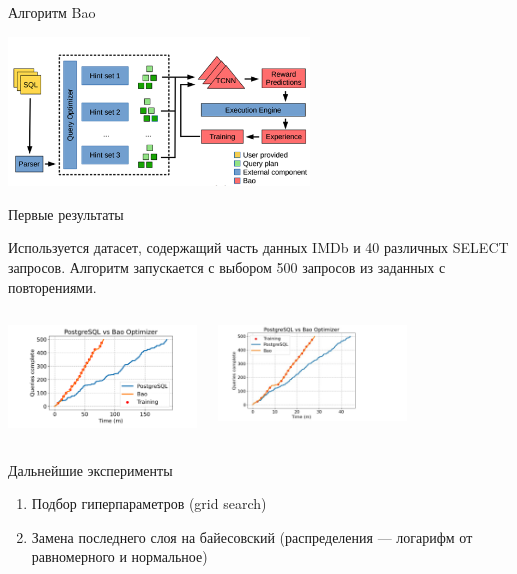 \documentclass{beamer}
\begin{document}
\begin{frame}{Алгоритм Bao}
\begin{center}
\includegraphics[width=8cm]{bao.png}
\end{center}
\end{frame}
\begin{frame}{Первые результаты}

Используется датасет, содержащий часть данных IMDb и 40 различных SELECT запросов.
Алгоритм запускается с выбором 500 запросов из заданных с повторениями.

\begin{columns}[T]
\begin{center}
\includegraphics[width=5cm]{article-results.png}
\end{center}
\begin{center}
\includegraphics[width=5cm]{real-results.png}
\end{center}
\end{columns}

\end{frame}
\begin{frame}{Дальнейшие эксперименты}
\begin{enumerate}
    \item
			Подбор гиперпараметров (grid search)
    \item
			Замена последнего слоя на байесовский (распределения — логарифм от равномерного и нормальное)
    \end{enumerate}
\end{frame}
\end{document}
